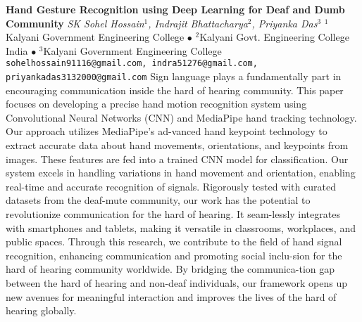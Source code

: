 
    \begin{conf-abstract}[]
        {\textbf{Hand Gesture Recognition using Deep Learning for Deaf and Dumb Community}}
        {\textit{SK Sohel Hossain$^{1}$, Indrajit Bhattacharya$^{2}$, Priyanka Das$^{3}$}}
        {$^{1}$Kalyani Government Engineering College $\bullet$ $^{2}$Kalyani Govt. Engineering College India $\bullet$ $^{3}$Kalyani Government Engineering College}
        {\texttt{sohelhossain91116@gmail.com, indra51276@gmail.com, priyankadas3132000@gmail.com}}
        {Sign language plays a fundamentally part in encouraging communication inside the hard of hearing community. This paper focuses on developing a precise hand motion recognition system using Convolutional Neural Networks (CNN) and MediaPipe hand tracking technology. Our approach utilizes MediaPipe's ad-vanced hand keypoint technology to extract accurate data about hand movements, orientations, and keypoints from images. These features are fed into a trained CNN model for classification. Our system excels in handling variations in hand movement and orientation, enabling real-time and accurate recognition of signals. Rigorously tested with curated datasets from the deaf-mute community, our work has the potential to revolutionize communication for the hard of hearing. It seam-lessly integrates with smartphones and tablets, making it versatile in classrooms, workplaces, and public spaces. Through this research, we contribute to the field of hand signal recognition, enhancing communication and promoting social inclu-sion for the hard of hearing community worldwide. By bridging the communica-tion gap between the hard of hearing and non-deaf individuals, our framework opens up new avenues for meaningful interaction and improves the lives of the hard of hearing globally.}
    \end{conf-abstract}
        